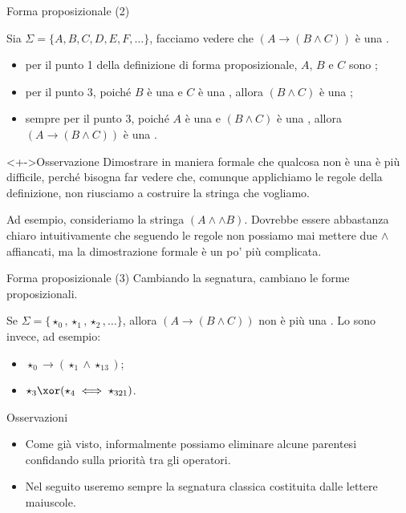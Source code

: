 \documentclass[aspectratio=169,10pt,dvipsnames,xcolor=table,handout]{beamer}
\begin{document}
\begin{frame}{Forma proposizionale (2)}
    \begin{example}
        Sia $\Sigma=\{A, B, C, D, E, F, \ldots \}$, facciamo vedere che  $(A \to (B \land C))$ è una \fp.
        \begin{itemize}[<+->]
            \item per il punto 1 della definizione di forma proposizionale, $A$, $B$ e $C$ sono \fp;
            \item per il punto 3, poiché $B$ è una \fp e $C$ è una \fp, allora $(B \land C)$ è una \fp;
            \item sempre per il punto 3, poiché $A$ è una \fp e $(B \land C)$ è una \fp, allora $(A \to (B \land C))$ è una \fp.
        \end{itemize}
    \end{example}

    \begin{block}<+->{Osservazione}
        Dimostrare in maniera formale che qualcosa non è una \fp è più difficile, perché bisogna far vedere che, comunque applichiamo le regole della definizione, non riusciamo a costruire la stringa che vogliamo.

        \medskip
        Ad esempio, consideriamo la stringa $(A \wedge \wedge B)$. Dovrebbe essere abbastanza chiaro intuitivamente che seguendo le regole non possiamo mai mettere due $\wedge$ affiancati, ma la dimostrazione formale è un po' più complicata.
    \end{block}
\end{frame}

\begin{frame}{Forma proposizionale (3)}
    Cambiando la segnatura, cambiano le forme proposizionali.
    \begin{example}
        Se $\Sigma=\{\star_0, \star_1, \star_2, \ldots \}$, allora $(A \to (B \land C))$ non è più una \fp. Lo sono invece, ad esempio:
        \begin{itemize}
            \item $\star_0 \to (\star_1 \land \star_{13})$;
            \item $\star_3 \xor (\star_4 \iff \star_{321})$.
        \end{itemize}
    \end{example}

    \pause
    \begin{block}{Osservazioni}
        \begin{itemize}
            \item  Come già visto, informalmente possiamo eliminare alcune parentesi confidando sulla priorità tra gli operatori.
            \item Nel seguito useremo sempre la segnatura classica costituita dalle lettere maiuscole.
        \end{itemize}
    \end{block}
\end{frame}
\end{document}
